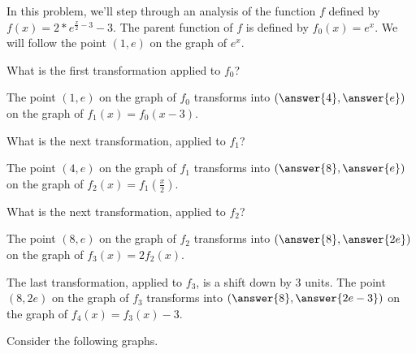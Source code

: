 \documentclass{ximera}
\author{Kenneth Berglund}
\begin{document}
In this problem, we'll step through an analysis of the function $f$ defined by $f(x) = 2 \ast e^{\frac{x}{2} - 3} - 3$. The parent function of $f$ is defined by $f_0(x) = e^x$. We will follow the point $(1, e)$ on the graph of $e^x$. 
\begin{exercise}
What is the first transformation applied to $f_0$? 
\begin{multipleChoice}
\end{multipleChoice}

\begin{exercise}
The point $(1, e)$ on the graph of $f_0$ transforms into $(\answer{4}, \answer{e})$ on the graph of $f_1(x) = f_0(x - 3)$. 

\begin{exercise}
What is the next transformation, applied to $f_1$?
\begin{multipleChoice}
\end{multipleChoice}

\begin{exercise}
The point $(4, e)$ on the graph of $f_1$ transforms into $(\answer{8}, \answer{e})$ on the graph of $f_2(x) = f_1\left(\frac{x}{2}\right)$. 

\begin{exercise}
What is the next transformation, applied to $f_2$?
\begin{multipleChoice}
\end{multipleChoice}

\begin{exercise}
The point $(8, e)$ on the graph of $f_2$ transforms into $(\answer{8}, \answer{2e})$ on the graph of $f_3(x) = 2f_2\left(x\right)$. 

\begin{exercise}
The last transformation, applied to $f_3$, is a shift down by 3 units. The point $(8, 2e)$ on the graph of $f_3$ transforms into $(\answer{8}, \answer{2e - 3})$ on the graph of $f_4(x) = f_3(x) - 3$. 

\begin{exercise}
Consider the following graphs.


\end{exercise}
\end{exercise}
\end{exercise}
\end{exercise}
\end{exercise}
\end{exercise}
\end{exercise}
\end{exercise}
\end{document}
